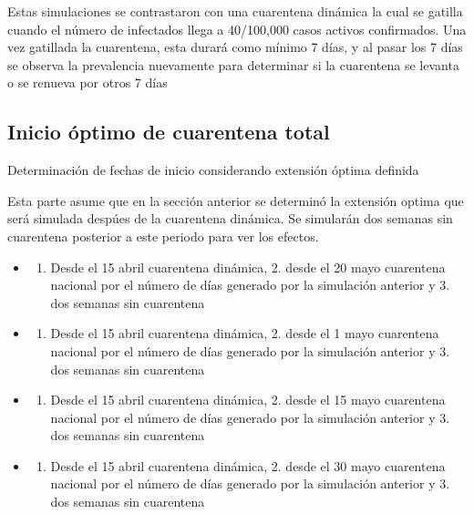 \documentclass[]{article}
\providecommand{\tightlist}{%
  \setlength{\itemsep}{0pt}\setlength{\parskip}{0pt}}
\begin{document}
Estas simulaciones se contrastaron con una cuarentena dinámica la cual se gatilla cuando el número de infectados llega a 40/100,000 casos activos confirmados. Una vez gatillada la cuarentena, esta durará como mínimo 7 días, y al pasar los 7 días se observa la prevalencia nuevamente para determinar si la cuarentena se levanta o se renueva por otros 7 días

\hypertarget{inicio-uxf3ptimo-de-cuarentena-total}{%
\subsection{Inicio óptimo de cuarentena total}\label{inicio-uxf3ptimo-de-cuarentena-total}}

Determinación de fechas de inicio considerando extensión óptima definida

Esta parte asume que en la sección anterior se determinó la extensión optima que será simulada despúes de la cuarentena dinámica. Se simularán dos semanas sin cuarentena posterior a este periodo para ver los efectos.

\begin{itemize}
\item
  \begin{enumerate}
  \def\labelenumi{\arabic{enumi}.}
  \tightlist
  \item
    Desde el 15 abril cuarentena dinámica, 2. desde el 20 mayo cuarentena nacional por el número de días generado por la simulación anterior y 3. dos semanas sin cuarentena
  \end{enumerate}
\item
  \begin{enumerate}
  \def\labelenumi{\arabic{enumi}.}
  \tightlist
  \item
    Desde el 15 abril cuarentena dinámica, 2. desde el 1 mayo cuarentena nacional por el número de días generado por la simulación anterior y 3. dos semanas sin cuarentena
  \end{enumerate}
\item
  \begin{enumerate}
  \def\labelenumi{\arabic{enumi}.}
  \tightlist
  \item
    Desde el 15 abril cuarentena dinámica, 2. desde el 15 mayo cuarentena nacional por el número de días generado por la simulación anterior y 3. dos semanas sin cuarentena
  \end{enumerate}
\item
  \begin{enumerate}
  \def\labelenumi{\arabic{enumi}.}
  \tightlist
  \item
    Desde el 15 abril cuarentena dinámica, 2. desde el 30 mayo cuarentena nacional por el número de días generado por la simulación anterior y 3. dos semanas sin cuarentena
  \end{enumerate}
\end{itemize}
\end{document}
